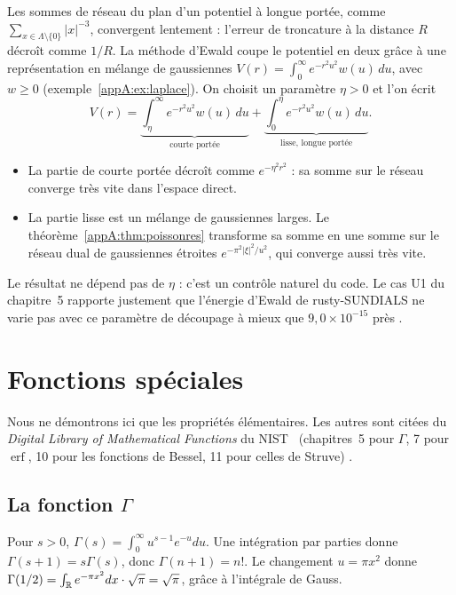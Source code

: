 Les sommes de réseau du plan d'un potentiel à longue portée, comme $\sum_{x\in\Lambda\setminus\{0\}}|x|^{-3}$, convergent
lentement : l'erreur de troncature à la distance $R$ décroît comme $1/R$. La méthode d'Ewald coupe le potentiel en deux
grâce à une représentation en mélange de gaussiennes $V(r)=\int_0^\infty e^{-r^2u^2}w(u)\,du$, avec $w\ge0$
(exemple~\ref{appA:ex:laplace}). On choisit un paramètre $\eta>0$ et l'on écrit
\[V(r)=\underbrace{\int_\eta^\infty e^{-r^2u^2}w(u)\,du}_{\text{courte portée}}+
\underbrace{\int_0^\eta e^{-r^2u^2}w(u)\,du}_{\text{lisse, longue portée}} .\]
\begin{itemize}
\item La partie de courte portée décroît comme $e^{-\eta^2r^2}$ : sa somme sur le réseau converge très vite dans
l'espace direct.
\item La partie lisse est un mélange de gaussiennes larges. Le théorème~\ref{appA:thm:poissonres} transforme sa somme
en une somme sur le réseau dual de gaussiennes étroites $e^{-\pi^2|\xi|^2/u^2}$, qui converge aussi très vite.
\end{itemize}
Le résultat ne dépend pas de $\eta$ : c'est un contrôle naturel du code. Le cas U1 du chapitre~5 rapporte
justement que l'énergie d'Ewald de rusty-SUNDIALS ne varie pas avec ce paramètre de découpage à mieux que
$9{,}0\times10^{-15}$ près \tierX.

\section{Fonctions spéciales}\label{appA:sec:speciales}

Nous ne démontrons ici que les propriétés élémentaires. Les autres sont citées du \emph{Digital Library of
Mathematical Functions} du NIST~\cite{app:dlmf} (chapitres~5 pour $\Gamma$, 7 pour $\operatorname{erf}$, 10 pour les
fonctions de Bessel, 11 pour celles de Struve) \tierL.

\subsection{La fonction \texorpdfstring{$\Gamma$}{Gamma}}
Pour $s>0$, $\Gamma(s)=\int_0^\infty u^{s-1}e^{-u}du$. Une intégration par parties donne $\Gamma(s+1)=s\Gamma(s)$, donc
$\Gamma(n+1)=n!$. Le changement $u=\pi x^2$ donne $\Gamma(1/2)=\int_{\mathbb{R}} e^{-\pi x^2}dx\cdot\sqrt\pi=\sqrt\pi$, grâce à
l'intégrale de Gauss.

